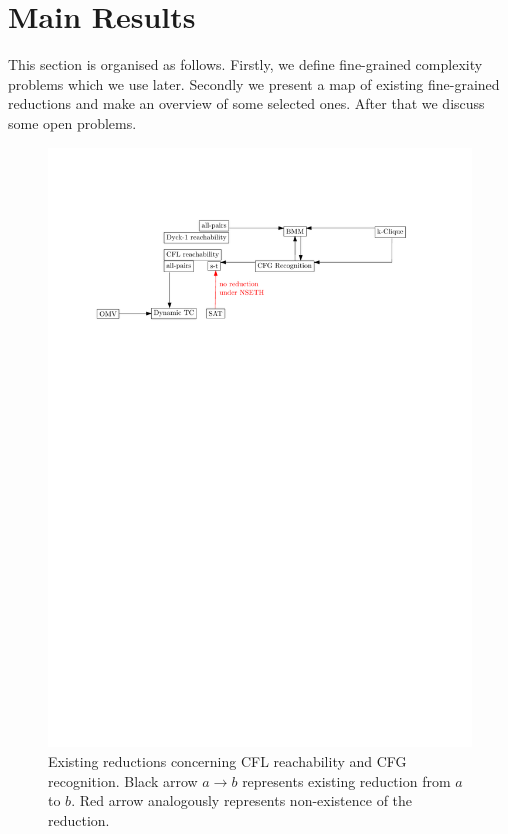 \documentclass[acmsmall,nonacm]{acmart}
\begin{document}
	\section{Main Results}

	This section is organised as follows. Firstly, we define fine-grained complexity problems which we use later. Secondly we present a map of existing fine-grained reductions and make an overview of some selected ones. After that we discuss some open problems. 

	\begin{figure}[!htp]
	
		\begin{center}  
			\includegraphics[scale = 0.6]{map_popl.pdf}
		\end{center}
		
		\caption{Existing reductions concerning CFL reachability and CFG recognition. Black arrow $a \rightarrow b$ represents existing reduction from $a$ to $b$. Red arrow analogously represents non-existence of the reduction. }
		\label{fig:map}
		
	\end{figure}
\end{document}
